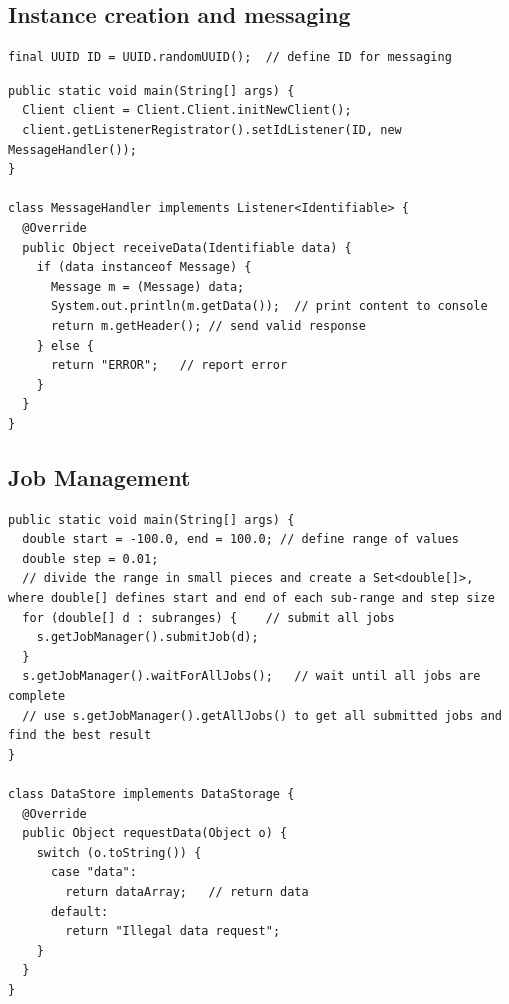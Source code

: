 \documentclass[a4paper,12pt]{article}
\begin{document}
\subsection{Instance creation and messaging}\label{appMsg}
\begin{lstlisting}[title=Constant declaration]
final UUID ID = UUID.randomUUID();	// define ID for messaging
\end{lstlisting}
\begin{lstlisting}[title=Client side code]
public static void main(String[] args) {
  Client client = Client.Client.initNewClient();
  client.getListenerRegistrator().setIdListener(ID, new MessageHandler());
}

class MessageHandler implements Listener<Identifiable> {
  @Override
  public Object receiveData(Identifiable data) {
    if (data instanceof Message) {
      Message m = (Message) data;
      System.out.println(m.getData());	// print content to console
      return m.getHeader();	// send valid response
    } else {
      return "ERROR";	// report error
    }
  }
}
\end{lstlisting}

\subsection{Job Management}\label{appJm}
\begin{lstlisting}[title=Server side code]
public static void main(String[] args) {
  double start = -100.0, end = 100.0; // define range of values
  double step = 0.01;
  // divide the range in small pieces and create a Set<double[]>, where double[] defines start and end of each sub-range and step size
  for (double[] d : subranges) {	// submit all jobs
    s.getJobManager().submitJob(d);
  }
  s.getJobManager().waitForAllJobs();	// wait until all jobs are complete
  // use s.getJobManager().getAllJobs() to get all submitted jobs and find the best result
}

class DataStore implements DataStorage {
  @Override
  public Object requestData(Object o) {
    switch (o.toString()) {
      case "data":
        return dataArray;	// return data
      default:
        return "Illegal data request";
    }
  }
}
\end{lstlisting}
\end{document}
